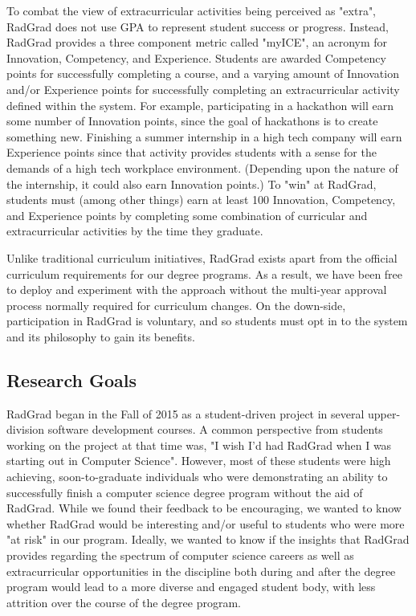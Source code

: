 \documentclass[acmsmall,nonacm]{acmart}
\begin{document}
To combat the view of extracurricular activities being perceived as "extra", RadGrad does not use GPA to represent student success or progress. Instead, RadGrad provides a three component metric called "myICE", an acronym for Innovation, Competency, and Experience. Students are awarded Competency points for successfully completing a course, and a varying amount of Innovation and/or Experience points for successfully completing an extracurricular activity defined within the system. For example, participating in a hackathon will earn some number of Innovation points, since the goal of hackathons is to create something new.  Finishing a summer internship in a high tech company will earn Experience points since that activity provides students with a sense for the demands of a high tech workplace environment. (Depending upon the nature of the internship, it could also earn Innovation points.) To "win" at RadGrad, students must (among other things) earn at least 100 Innovation, Competency, and Experience points by completing some combination of curricular and extracurricular activities by the time they graduate.

Unlike traditional curriculum initiatives, RadGrad exists apart from the official curriculum requirements for our degree programs. As a result, we have been free to deploy and experiment with the approach without the multi-year approval process normally required for curriculum changes.  On the down-side, participation in RadGrad is voluntary, and so students must opt in to the system and its philosophy to gain its benefits.

\subsection{Research Goals}

RadGrad began in the Fall of 2015 as a student-driven project in several upper-division software development courses.  A common perspective from students working on the project at that time was, "I wish I'd had RadGrad when I was starting out in Computer Science".  However, most of these students were high achieving, soon-to-graduate individuals who were demonstrating an ability to successfully finish a computer science degree program without the aid of RadGrad.  While we found their feedback to be encouraging, we wanted to know whether RadGrad would be interesting and/or useful to students who were more "at risk" in our program. Ideally, we wanted to know if the insights that RadGrad provides regarding the spectrum of computer science careers as well as extracurricular opportunities in the discipline both during and after the degree program would lead to a more diverse and engaged student body, with less attrition over the course of the degree program.
\end{document}
